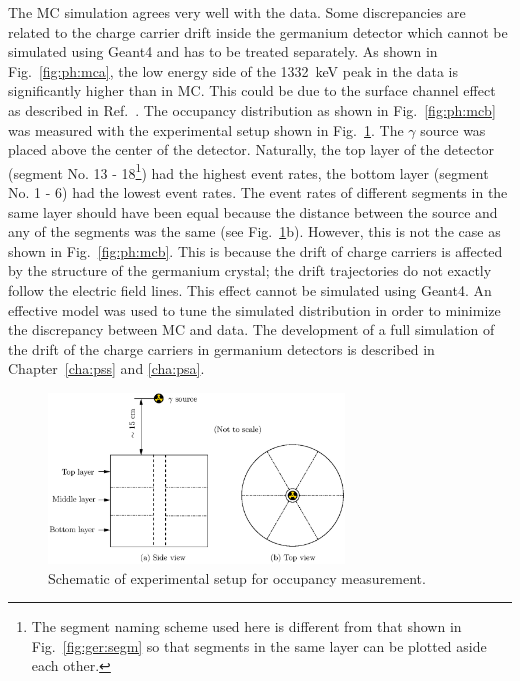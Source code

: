 The MC simulation agrees very well with the data. Some discrepancies are related to the charge carrier drift inside the germanium detector which cannot be simulated using Geant4 and has to be treated separately. As shown in Fig.~\ref{fig:ph:mca}, the low energy side of the 1332~keV peak in the data is significantly higher than in MC. This could be due to the surface channel effect as described in Ref.~\cite{Sur05}. The occupancy distribution as shown in Fig.~\ref{fig:ph:mcb} was measured with the experimental setup shown in Fig.~\ref{fig:ph:occ}. The $\gamma$ source was placed above the center of the detector. Naturally, the top layer of the detector (segment No. 13 - 18\footnote{The segment naming scheme used here is different from that shown in Fig.~\ref{fig:ger:segm} so that segments in the same layer can be plotted aside each other.}) had the highest event rates, the bottom layer (segment No. 1 - 6) had the lowest event rates. The event rates of different segments in the same layer should have been equal because the distance between the source and any of the segments was the same (see Fig.~\ref{fig:ph:occ}b). However, this is not the case as shown in Fig.~\ref{fig:ph:mcb}. This is because the drift of charge carriers is affected by the structure of the germanium crystal; the drift trajectories do not exactly follow the electric field lines. This effect cannot be simulated using Geant4. An effective model was used to tune the simulated distribution in order to minimize the discrepancy between MC and data. The development of a full simulation of the drift of the charge carriers in germanium detectors is described in Chapter~\ref{cha:pss} and \ref{cha:psa}.

\begin{figure}[htpb]
\centering
\includegraphics[width=0.7\textwidth]{occumea}
\caption{Schematic of experimental setup for occupancy measurement.}
\label{fig:ph:occ}
\end{figure}

